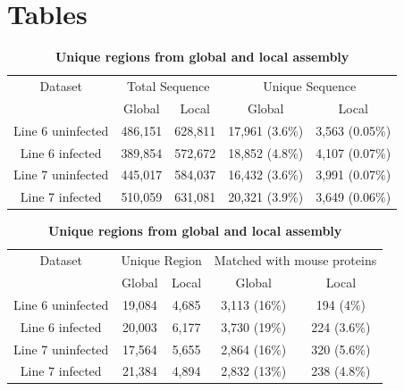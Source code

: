 \documentclass[10pt]{article}
\begin{document}
\section*{Tables}
\begin{table}[!ht]
\caption{
\bf{Unique sequences from global and local assembly}}
\begin{tabular}{ccccc}
\hline
Dataset & \multicolumn{2}{c}{Total Sequence} & \multicolumn{2}{c}{Unique Sequence}\\
 & Global & Local & Global & Local\\
\hline
Line 6 uninfected & 486,151 & 628,811 & 17,961 (3.6\%) & 3,563 (0.05\%)\\
Line 6 infected & 389,854 & 572,672 & 18,852 (4.8\%)& 4,107 (0.07\%)\\
Line 7 uninfected & 445,017 & 584,037 & 16,432 (3.6\%) & 3,991 (0.07\%)\\
Line 7 infected & 510,059 & 631,081 & 20,321 (3.9\%)& 3,649 (0.06\%)\\
\hline
\end{tabular}

\caption{
\bf{Unique regions from global and local assembly}}
\begin{tabular}{ccccc}
\hline
Dataset & \multicolumn{2}{c}{Unique Region} & \multicolumn{2}{c}{Matched with mouse proteins}\\
 & Global & Local & Global & Local\\
\hline
Line 6 uninfected & 19,084 & 4,685 & 3,113 (16\%) & 194 (4\%)\\
Line 6 infected & 20,003 & 6,177 & 3,730 (19\%)& 224 (3.6\%)\\
Line 7 uninfected & 17,564 & 5,655 & 2,864 (16\%) & 320 (5.6\%)\\
Line 7 infected & 21,384 & 4,894 & 2,832 (13\%)& 238 (4.8\%)\\
\hline
\end{tabular}


\end{table}
\end{document}
